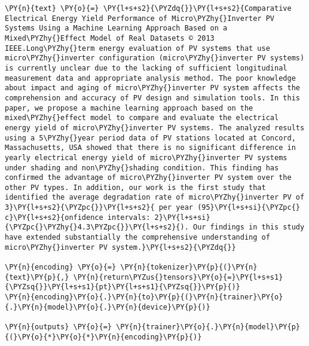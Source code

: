 \documentclass[../main.tex]{subfiles}
\begin{document}
    \begin{tcolorbox}[breakable, size=fbox, boxrule=1pt, pad at break*=1mm,colback=cellbackground, colframe=cellborder]
\begin{Verbatim}[commandchars=\\\{\}]
\PY{n}{text} \PY{o}{=} \PY{l+s+s2}{\PYZdq{}}\PY{l+s+s2}{Comparative Electrical Energy Yield Performance of Micro\PYZhy{}Inverter PV Systems Using a Machine Learning Approach Based on a Mixed\PYZhy{}Effect Model of Real Datasets © 2013 IEEE.Long\PYZhy{}term energy evaluation of PV systems that use micro\PYZhy{}inverter configuration (micro\PYZhy{}inverter PV systems) is currently unclear due to the lacking of sufficient longitudinal measurement data and appropriate analysis method. The poor knowledge about impact and aging of micro\PYZhy{}inverter PV system affects the comprehension and accuracy of PV design and simulation tools. In this paper, we propose a machine learning approach based on the mixed\PYZhy{}effect model to compare and evaluate the electrical energy yield of micro\PYZhy{}inverter PV systems. The analyzed results using a 5\PYZhy{}year period data of PV stations located at Concord, Massachusetts, USA showed that there is no significant difference in yearly electrical energy yield of micro\PYZhy{}inverter PV systems under shading and non\PYZhy{}shading condition. This finding has confirmed the advantage of micro\PYZhy{}inverter PV system over the other PV types. In addition, our work is the first study that identified the average degradation rate of micro\PYZhy{}inverter PV of 3}\PY{l+s+s2}{\PYZpc{}}\PY{l+s+s2}{ per year (95}\PY{l+s+si}{\PYZpc{} c}\PY{l+s+s2}{onfidence intervals: 2}\PY{l+s+si}{\PYZpc{}\PYZhy{}4.3\PYZpc{}}\PY{l+s+s2}{). Our findings in this study have extended substantially the comprehensive understanding of micro\PYZhy{}inverter PV system.}\PY{l+s+s2}{\PYZdq{}}

\PY{n}{encoding} \PY{o}{=} \PY{n}{tokenizer}\PY{p}{(}\PY{n}{text}\PY{p}{,} \PY{n}{return\PYZus{}tensors}\PY{o}{=}\PY{l+s+s1}{\PYZsq{}}\PY{l+s+s1}{pt}\PY{l+s+s1}{\PYZsq{}}\PY{p}{)}
\PY{n}{encoding}\PY{o}{.}\PY{n}{to}\PY{p}{(}\PY{n}{trainer}\PY{o}{.}\PY{n}{model}\PY{o}{.}\PY{n}{device}\PY{p}{)}

\PY{n}{outputs} \PY{o}{=} \PY{n}{trainer}\PY{o}{.}\PY{n}{model}\PY{p}{(}\PY{o}{*}\PY{o}{*}\PY{n}{encoding}\PY{p}{)}
\end{Verbatim}
\end{tcolorbox}
\end{document}
